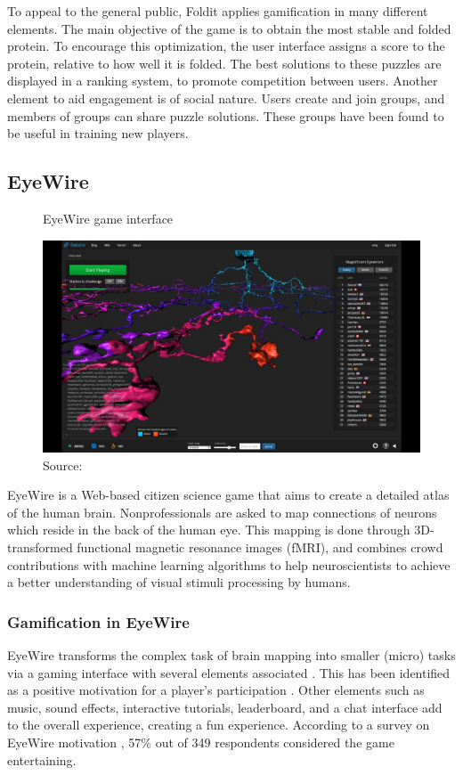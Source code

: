 To appeal to the general public, Foldit applies gamification in many different elements. The main objective of the game is to obtain the most stable and folded protein. To encourage this optimization, the user interface assigns a score to the protein, relative to how well it is folded. The best solutions to these puzzles are displayed in a ranking system, to promote competition between users. Another element to aid engagement is of social nature. Users create and join groups, and members of groups can share puzzle solutions. These groups have been found to be useful in training new players.

\subsection{EyeWire}

\begin{figure}[ht]
    \centering
    \caption{EyeWire game interface}
    \includegraphics[width=0.8\linewidth]{images/background/eyewire.jpg}
    \caption*{Source: \cite{eyewire2014how}}
    \label{fig:eyewire-game-interface}
\end{figure}

EyeWire is a Web-based citizen science game that aims to create a detailed atlas of the human brain. Nonprofessionals are asked to map connections of neurons which reside in the back of the human eye. This mapping is done through 3D-transformed functional magnetic resonance images (fMRI), and combines crowd contributions with machine learning algorithms to help neuroscientists to achieve a better understanding of visual stimuli processing by humans.

\subsubsection*{Gamification in EyeWire}

EyeWire transforms the complex task of brain mapping into smaller (micro) tasks via a gaming interface with several elements associated \cite{seaborn2015gamification}. This has been identified as a positive motivation for a player's participation \cite{tinati2016because}. Other elements such as music, sound effects, interactive tutorials, leaderboard, and a chat interface add to the overall experience, creating a fun experience. According to a survey on EyeWire motivation \cite{tinati2016because}, 57\% out of 349 respondents considered the game entertaining.

